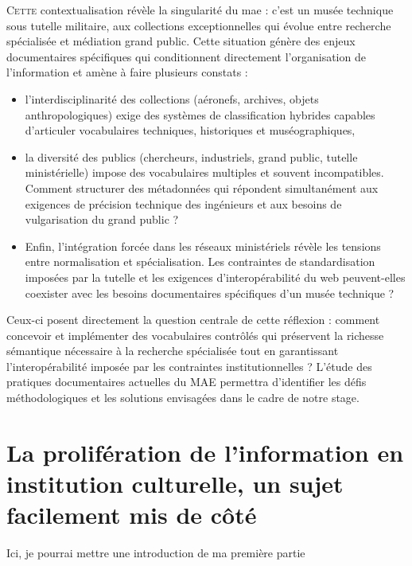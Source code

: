 \documentclass[12pt,twoside]{book}
\newcommand{\maelong}{\acf{mae} }
\begin{document}
	\lettrine{C}{ette} contextualisation révèle la singularité du \maelong : c'est un musée technique sous tutelle militaire, aux collections exceptionnelles qui évolue entre recherche spécialisée et médiation grand public. Cette situation génère des enjeux documentaires spécifiques qui conditionnent directement l'organisation de l'information et amène à faire plusieurs constats : 
	\begin{itemize}
		\item l'interdisciplinarité des collections (aéronefs, archives, objets anthropologiques) exige des systèmes de classification hybrides capables d'articuler vocabulaires techniques, historiques et muséographiques,
		\item la diversité des publics (chercheurs, industriels, grand public, tutelle ministérielle) impose des vocabulaires multiples et souvent incompatibles. Comment structurer des métadonnées qui répondent simultanément aux exigences de précision technique des ingénieurs et aux besoins de vulgarisation du grand public ?
		\item Enfin, l'intégration forcée dans les réseaux ministériels révèle les tensions entre normalisation et spécialisation. Les contraintes de standardisation imposées par la tutelle et les exigences d'interopérabilité du web peuvent-elles coexister avec les besoins documentaires spécifiques d'un musée technique ?
	\end{itemize}
	
	Ceux-ci posent directement la question centrale de cette réflexion : comment concevoir et implémenter des vocabulaires contrôlés qui préservent la richesse sémantique nécessaire à la recherche spécialisée tout en garantissant l'interopérabilité imposée par les contraintes institutionnelles ? L'étude des pratiques documentaires actuelles du MAE permettra d'identifier les défis méthodologiques et les solutions envisagées dans le cadre de notre stage.
	
	
	\part{La prolifération de l'information en institution culturelle, un sujet facilement mis de côté}
	
	
	Ici, je pourrai mettre une introduction de ma première partie
	
\end{document}
